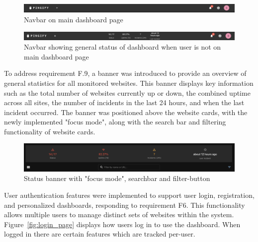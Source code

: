 \begin{figure}[H]
    \centering
    \includegraphics[width=1\linewidth]{figures/MVP-dashboard/navbar-mvp.png}
    \caption{Navbar on main dashboard page}
    \label{fig:mvp_navbar}
\end{figure}


\begin{figure}[H]
    \centering
    \includegraphics[width=1\linewidth]{figures/MVP-dashboard/navbar-mvp-status.png}
    \caption{Navbar showing general status of dashboard when user is not on main dashboard page}
    \label{fig:mvp_navbar_status}
\end{figure}


To address requirement F.9, a banner was introduced to provide an overview of general statistics for all monitored websites. This banner displays key information such as the total number of websites currently up or down, the combined uptime across all sites, the number of incidents in the last 24 hours, and when the last incident occurred. The banner was positioned above the website cards, with the newly implemented "focus mode", along with the search bar and filtering functionality of website cards. 


\begin{figure}
    \centering
    \includegraphics[width=0.8\linewidth]{figures/MVP-dashboard/MVP-statusbanner.png}
    \caption{Status banner with "focus mode", searchbar and filter-button}
    \label{fig:mvp_pinned_card}
\end{figure}


User authentication features were implemented to support user login, registration, and personalized dashboards, responding to requirement F6. This functionality allows multiple users to manage distinct sets of websites within the system. Figure~\ref{fig:login_page} displays how users log in to use the dashboard. When logged in there are certain features which are tracked per-user.

